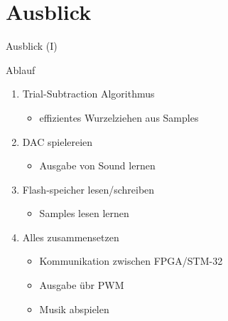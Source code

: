   \section{Ausblick}
  \begin{frame} {Ausblick (I)}
    \begin{block} {Ablauf}
      \begin{enumerate}
        \item Trial-Subtraction Algorithmus
        \begin{itemize}
          \item effizientes Wurzelziehen aus Samples
        \end{itemize}
        \item DAC spielereien
        \begin{itemize}
          \item Ausgabe von Sound lernen
        \end{itemize}
        \item Flash-speicher lesen/schreiben
        \begin{itemize}
          \item Samples lesen lernen
        \end{itemize}
        \item Alles zusammensetzen
        \begin{itemize}
          \item Kommunikation zwischen FPGA/STM-32
          \item Ausgabe übr PWM
          \item Musik abspielen
        \end{itemize}
      \end{enumerate}
    \end{block}
  \end{frame}


